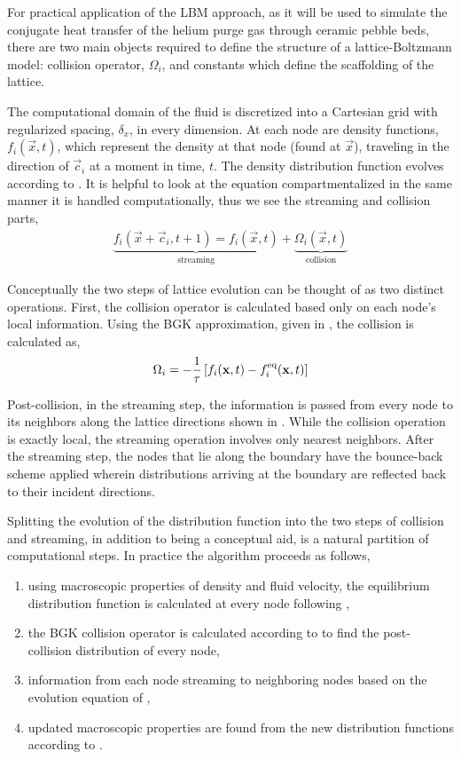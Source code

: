For practical application of the LBM approach, as it will be used to simulate the conjugate heat transfer of the helium purge gas through ceramic pebble beds, there are two main objects required to define the structure of a lattice-Boltzmann model: collision operator, $\Omega_i$, and constants which define the scaffolding of the lattice.

The computational domain of the fluid is discretized into a Cartesian grid with regularized spacing, $\delta_x$, in every dimension. At each node are density functions, $f_i(\vec{x},t)$, which represent the density at that node (found at $\vec{x}$), traveling in the direction of $\vec{c}_i$ at a moment in time, $t$. The density distribution function evolves according to . It is helpful to look at the equation compartmentalized in the same manner it is handled computationally, thus we see the streaming and collision parts,
\begin{align*}
	\underbrace{f_i(\vec{x}+\vec{c}_i, t + 1)  = f_i(\vec{x},t)}_\text{streaming}  + \underbrace{\Omega_i(\vec{x},t)}_\text{collision}
\end{align*}

Conceptually the two steps of lattice evolution can be thought of as two distinct operations. First, the collision operator is calculated based only on each node's local information. Using the BGK approximation, given in , the collision is calculated as,
\begin{align*}
	\Omega_i = -\frac{1}{\tau}\left[f_i(\mathbf{x},t) - f_i^{\text{eq}}(\mathbf{x},t)\right]
\end{align*}

Post-collision, in the streaming step, the information is passed from every node to its neighbors along the lattice directions shown in . While the collision operation is exactly local, the streaming operation involves only nearest neighbors. After the streaming step, the nodes that lie along the boundary have the bounce-back scheme applied wherein distributions arriving at the boundary are reflected back to their incident directions.

Splitting the evolution of the distribution function into the two steps of collision and streaming, in addition to being a conceptual aid, is a natural partition of computational steps. In practice the algorithm proceeds as follows,\cite{Viggen2009}
\begin{enumerate}
	\item{using macroscopic properties of density and fluid velocity, the equilibrium distribution function is calculated at every node following ,}
	\item{the BGK collision operator is calculated according to  to find the post-collision distribution of every node,}
	\item{information from each node streaming to neighboring nodes based on the evolution equation of ,}
	\item{updated macroscopic properties are found from the new distribution functions according to .}
\end{enumerate}

